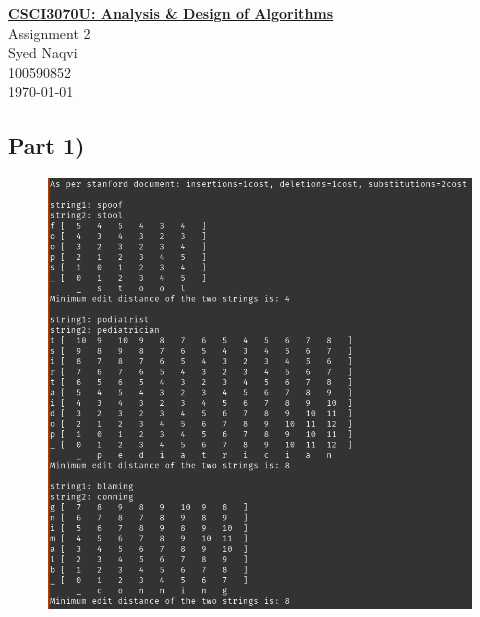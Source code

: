 \documentclass{article}
\begin{document}
    \begin{titlepage}
        \begin{center}
            \LARGE\textbf{\underline{CSCI3070U: Analysis \& Design of Algorithms}}\\
            \vspace*{10pt}
            \LARGE Assignment 2\\
            \vspace*{30pt}
            \large Syed Naqvi\\
            \large 100590852\\
            \large \today
        \end{center}
    \end{titlepage}
    
    \newpage
    
    \subsection*{Part 1)}

    \begin{center}
        \begin{minipage}[t]{1\textwidth}
            \begin{figure}[H]
                \centering
                \includegraphics[width=1\textwidth, height=0.7\textheight]{./p1.png}
            \end{figure}
        \end{minipage}
    \end{center}
\end{document}
